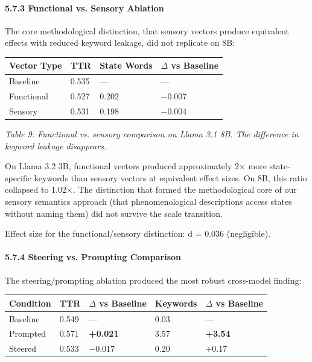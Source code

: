 \documentclass[11pt,a4paper]{article}
\begin{document}
\paragraph{5.7.3 Functional vs. Sensory Ablation}

The core methodological distinction, that sensory vectors produce equivalent effects with reduced keyword leakage, did not replicate on 8B:

\begin{center}
\begin{tabular}{llll}
\toprule
Vector Type & TTR & State Words & \ensuremath{\Delta} vs Baseline \\
\midrule
Baseline & 0.535 & --- & --- \\
Functional & 0.527 & 0.202 & \ensuremath{-}0.007 \\
Sensory & 0.531 & 0.198 & \ensuremath{-}0.004 \\
\bottomrule
\end{tabular}
\end{center}

\emph{Table 9: Functional vs. sensory comparison on Llama 3.1 8B. The difference in keyword leakage disappears.}

On Llama 3.2 3B, functional vectors produced approximately 2\ensuremath{\times} more state-specific keywords than sensory vectors at equivalent effect sizes. On 8B, this ratio collapsed to 1.02\ensuremath{\times}. The distinction that formed the methodological core of our sensory semantics approach (that phenomenological descriptions access states without naming them) did not survive the scale transition.

Effect size for the functional/sensory distinction: d = 0.036 (negligible).

\paragraph{5.7.4 Steering vs. Prompting Comparison}

The steering/prompting ablation produced the most robust cross-model finding:

\begin{center}
\begin{tabular}{lllll}
\toprule
Condition & TTR & \ensuremath{\Delta} vs Baseline & Keywords & \ensuremath{\Delta} vs Baseline \\
\midrule
Baseline & 0.549 & --- & 0.03 & --- \\
Prompted & 0.571 & \textbf{+0.021} & 3.57 & \textbf{+3.54} \\
Steered & 0.533 & \ensuremath{-}0.017 & 0.20 & +0.17 \\
\bottomrule
\end{tabular}
\end{center}
\end{document}
